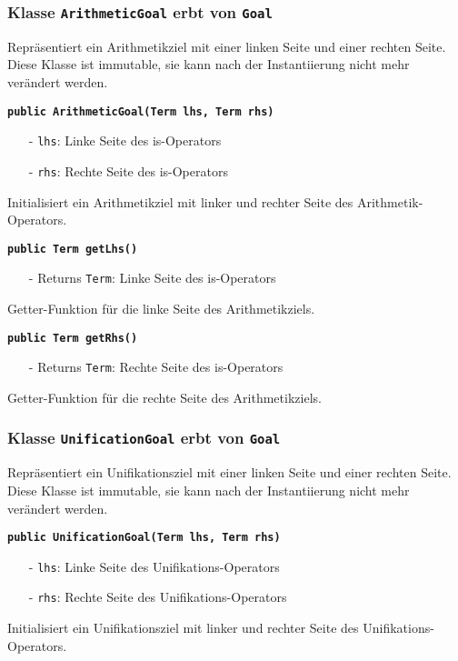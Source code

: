 \documentclass[parskip=full,11pt,twoside]{scrartcl}
\begin{document}
\subsubsection{Klasse \texttt{ArithmeticGoal} erbt von \texttt{Goal}}
Repräsentiert ein Arithmetikziel mit einer linken Seite und einer rechten Seite. Diese Klasse ist immutable, sie kann nach der Instantiierung nicht mehr verändert werden.

\textbf{\texttt{public ArithmeticGoal(Term lhs, Term rhs)}}
\begin{itemize}[noitemsep]
	\item[-] \texttt{lhs}: Linke Seite des is-Operators
	\item[-] \texttt{rhs}: Rechte Seite des is-Operators
\end{itemize}
Initialisiert ein Arithmetikziel mit linker und rechter Seite des Arithmetik-Operators.

\textbf{\texttt{public Term getLhs()}}
\begin{itemize}[noitemsep]
	\item[-] Returns \texttt{Term}: Linke Seite des is-Operators
\end{itemize}
Getter-Funktion für die linke Seite des Arithmetikziels.

\textbf{\texttt{public Term getRhs()}}
\begin{itemize}[noitemsep]
	\item[-] Returns \texttt{Term}: Rechte Seite des is-Operators
\end{itemize}
Getter-Funktion für die rechte Seite des Arithmetikziels.

\subsubsection{Klasse \texttt{UnificationGoal} erbt von \texttt{Goal}}
Repräsentiert ein Unifikationsziel mit einer linken Seite und einer rechten Seite. Diese Klasse ist immutable, sie kann nach der Instantiierung nicht mehr verändert werden.

\textbf{\texttt{public UnificationGoal(Term lhs, Term rhs)}}
\begin{itemize}[noitemsep]
	\item[-] \texttt{lhs}: Linke Seite des Unifikations-Operators
	\item[-] \texttt{rhs}: Rechte Seite des Unifikations-Operators
\end{itemize}
Initialisiert ein Unifikationsziel mit linker und rechter Seite des Unifikations-Operators.
\end{document}
